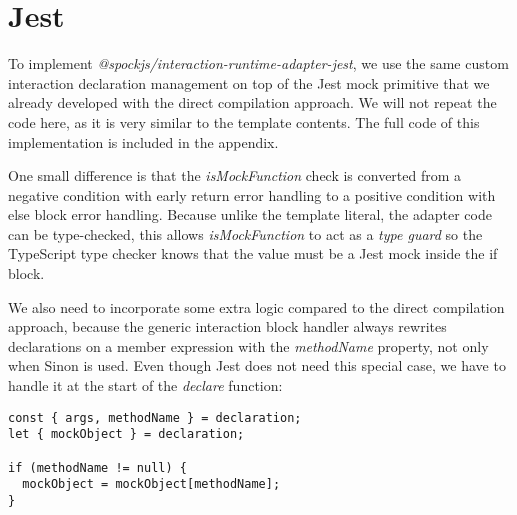 \section{Jest}
To implement \textit{@spockjs/interaction-runtime-adapter-jest},
we use the same custom interaction declaration management
on top of the Jest mock primitive
that we already developed with the direct compilation approach.
We will not repeat the code here,
as it is very similar to the template contents.
The full code of this implementation is included in the appendix.

One small difference is that the \textit{isMockFunction} check
is converted from a negative condition with early return error handling
to a positive condition with else block error handling.
Because unlike the template literal, the adapter code can be type-checked,
this allows \textit{isMockFunction} to act as a \textit{type guard}
so the TypeScript type checker knows that
the value must be a Jest mock inside the if block.

We also need to incorporate some extra logic
compared to the direct compilation approach,
because the generic interaction block handler
always rewrites declarations on a member expression
with the \textit{methodName} property,
not only when Sinon is used.
Even though Jest does not need this special case,
we have to handle it at the start of the \textit{declare} function:
\begin{verbatim}
const { args, methodName } = declaration;
let { mockObject } = declaration;

if (methodName != null) {
  mockObject = mockObject[methodName];
}
\end{verbatim}
